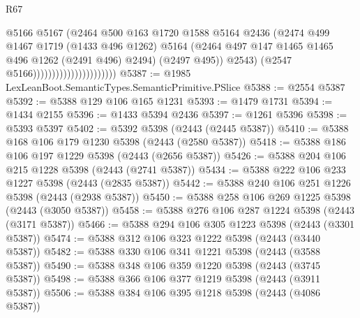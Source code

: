 \begin{lexlean}{R67}
\begin{coremodule}
                                              @5166
                                              @5167
                                              (@2464
                                                @500
                                                @163
                                                @1720
                                                @1588
                                                @5164
                                                @2436
                                                (@2474
                                                  @499
                                                  @1467
                                                  @1719
                                                  (@1433 @496 @1262)
                                                  @5164
                                                  (@2464
                                                    @497
                                                    @147
                                                    @1465
                                                    @1465
                                                    @496
                                                    @1262
                                                    (@2491 @496)
                                                    @2494)
                                                  (@2497 @495))
                                                @2543)
                                              (@2547 @5166))))))))))))))))))))))
@5387 := @1985 LexLeanBoot.SemanticTypes.SemanticPrimitive.PSlice
@5388 := @2554 @5387
@5392 := @5388 @129 @106 @165 @1231
@5393 := @1479 @1731
@5394 := @1434 @2155
@5396 := @1433 @5394 @2436
@5397 := @1261 @5396
@5398 := @5393 @5397
@5402 := @5392 @5398 (@2443 (@2445 @5387))
@5410 := @5388 @168 @106 @179 @1230 @5398 (@2443 (@2580 @5387))
@5418 := @5388 @186 @106 @197 @1229 @5398 (@2443 (@2656 @5387))
@5426 := @5388 @204 @106 @215 @1228 @5398 (@2443 (@2741 @5387))
@5434 := @5388 @222 @106 @233 @1227 @5398 (@2443 (@2835 @5387))
@5442 := @5388 @240 @106 @251 @1226 @5398 (@2443 (@2938 @5387))
@5450 := @5388 @258 @106 @269 @1225 @5398 (@2443 (@3050 @5387))
@5458 := @5388 @276 @106 @287 @1224 @5398 (@2443 (@3171 @5387))
@5466 := @5388 @294 @106 @305 @1223 @5398 (@2443 (@3301 @5387))
@5474 := @5388 @312 @106 @323 @1222 @5398 (@2443 (@3440 @5387))
@5482 := @5388 @330 @106 @341 @1221 @5398 (@2443 (@3588 @5387))
@5490 := @5388 @348 @106 @359 @1220 @5398 (@2443 (@3745 @5387))
@5498 := @5388 @366 @106 @377 @1219 @5398 (@2443 (@3911 @5387))
@5506 := @5388 @384 @106 @395 @1218 @5398 (@2443 (@4086 @5387))

\end{coremodule}
\end{lexlean}
